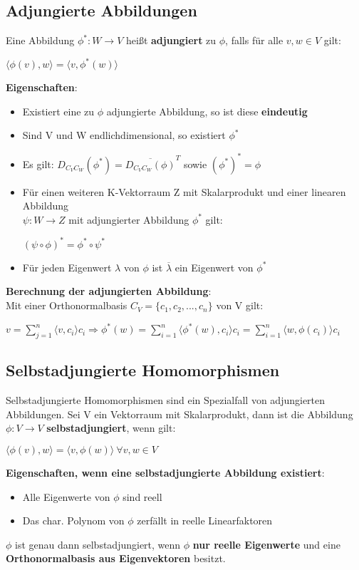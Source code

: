 \documentclass[10pt,a4paper]{article}
\begin{document}
	\subsection{Adjungierte Abbildungen}
	Eine Abbildung $\phi^*: W \rightarrow V$ heißt \textbf{adjungiert} zu $\phi$, falls für alle $v, w \in V$ gilt:
	\begin{center}
		$\langle \phi(v), w\rangle = \langle v, \phi^*(w)\rangle$
	\end{center}
	\textbf{Eigenschaften}:
	\begin{itemize}
		\item Existiert eine zu $\phi$ adjungierte Abbildung, so ist diese \textbf{eindeutig}
		\item Sind V und W endlichdimensional, so existiert $\phi^*$
		\item Es gilt: $D_{C_VC_W}(\phi^*) = \overline{D_{C_VC_W}(\phi)}^T$ sowie $(\phi^*)^* = \phi$
		\item Für einen weiteren K-Vektorraum Z mit Skalarprodukt und einer linearen Abbildung\\ $\psi: W \rightarrow Z$ mit adjungierter Abbildung $\phi^*$ gilt:
		\begin{center}
			$(\psi \circ \phi)^* = \phi^* \circ \psi^*$
		\end{center}
		\item Für jeden Eigenwert $\lambda$ von $\phi$ ist $\overline{\lambda}$ ein Eigenwert von $\phi^*$
	\end{itemize}
	\textbf{Berechnung der adjungierten Abbildung}:\\
	Mit einer Orthonormalbasis $C_V = \{c_1, c_2, ..., c_n\}$ von V gilt:
	\begin{center}
		$v = \sum_{j = 1}^{n}\langle v, c_i\rangle c_i \Rightarrow \phi^*(w) = \sum_{i = 1}^{n}\langle \phi^*(w), c_i\rangle c_i = \sum_{i = 1}^{n}\langle w, \phi(c_i)\rangle c_i$
	\end{center}
	
	\subsection{Selbstadjungierte Homomorphismen}
	Selbstadjungierte Homomorphismen sind ein Spezialfall von adjungierten Abbildungen. Sei V ein Vektorraum mit Skalarprodukt, dann ist die Abbildung $\phi: V \rightarrow V$ \textbf{selbstadjungiert}, wenn gilt:
	\begin{center}
		$\langle \phi(v), w\rangle = \langle v, \phi(w)\rangle\ \forall v, w\in V$
	\end{center}
	\textbf{Eigenschaften, wenn eine selbstadjungierte Abbildung existiert}:
	\begin{itemize}
		\item Alle Eigenwerte von $\phi$ sind reell
		\item Das char. Polynom von $\phi$ zerfällt in reelle Linearfaktoren
	\end{itemize}
	$\phi$ ist genau dann selbstadjungiert, wenn $\phi$ \textbf{nur reelle Eigenwerte} und eine \textbf{Orthonormalbasis aus Eigenvektoren} besitzt.
\end{document}
